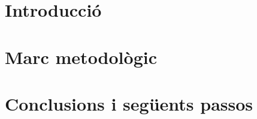 \documentclass[a4paper]{book}
\begin{document}

    
    \thispagestyle{empty} %
    
    \thispagestyle{empty}

    \pagestyle{plain}
    
    
    


    \pagestyle{fancy}

    \part{Introducció} %
    

    \part{Marc metodològic} %
    

    \part{Conclusions i següents passos} %
    

    
    
\end{document}
